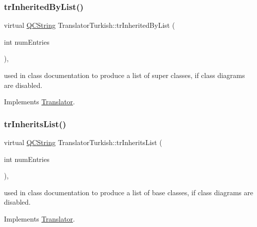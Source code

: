 \mbox{\label{class_translator_turkish_a60f5b03ed659bb2396172baae0b67a6c}} 
\subsubsection{\texorpdfstring{trInheritedByList()}{trInheritedByList()}}
{\footnotesize\ttfamily virtual \mbox{\hyperlink{class_q_c_string}{Q\+C\+String}} Translator\+Turkish\+::tr\+Inherited\+By\+List (\begin{DoxyParamCaption}\item[{int}]{num\+Entries }\end{DoxyParamCaption})\hspace{0.3cm}{\ttfamily [inline]}, {\ttfamily [virtual]}}

used in class documentation to produce a list of super classes, if class diagrams are disabled. 

Implements \mbox{\hyperlink{class_translator}{Translator}}.

\mbox{\label{class_translator_turkish_a67a2bcfccdba2807bae0537bd4031dce}} 
\subsubsection{\texorpdfstring{trInheritsList()}{trInheritsList()}}
{\footnotesize\ttfamily virtual \mbox{\hyperlink{class_q_c_string}{Q\+C\+String}} Translator\+Turkish\+::tr\+Inherits\+List (\begin{DoxyParamCaption}\item[{int}]{num\+Entries }\end{DoxyParamCaption})\hspace{0.3cm}{\ttfamily [inline]}, {\ttfamily [virtual]}}

used in class documentation to produce a list of base classes, if class diagrams are disabled. 

Implements \mbox{\hyperlink{class_translator}{Translator}}.

\mbox{\label{class_translator_turkish_acac4c2786b9620074ab60691dbbba2bf}} 
